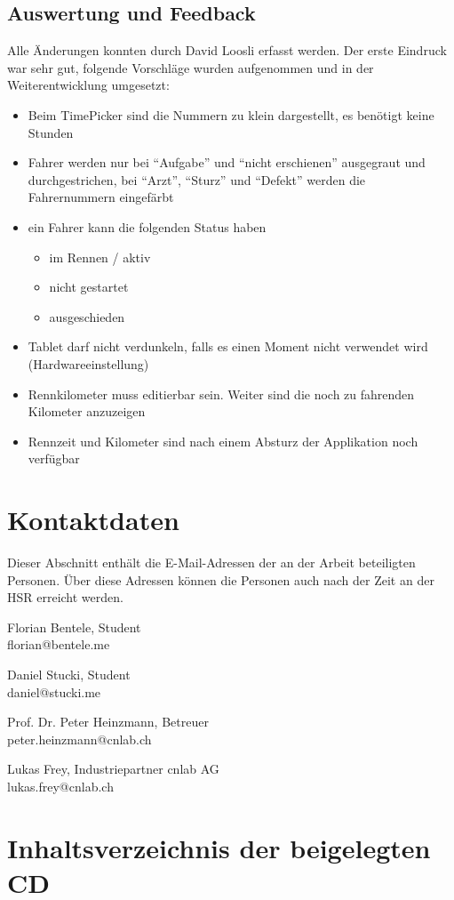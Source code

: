 \subsection{Auswertung und Feedback}
Alle Änderungen konnten durch David Loosli erfasst werden. Der erste Eindruck war sehr gut, folgende Vorschläge wurden aufgenommen und in der Weiterentwicklung umgesetzt:
\begin{itemize}
\item Beim TimePicker sind die Nummern zu klein dargestellt, es benötigt keine Stunden
\item Fahrer werden nur bei "`Aufgabe"'  und "`nicht erschienen"' ausgegraut und durchgestrichen, bei "`Arzt"', "`Sturz"' und "`Defekt"' werden die Fahrernummern eingefärbt
\item ein Fahrer kann die folgenden Status haben
\begin{itemize}
\item im Rennen / aktiv
\item nicht gestartet
\item ausgeschieden
\end{itemize}
\item Tablet darf nicht verdunkeln, falls es einen Moment nicht verwendet wird (Hardwareeinstellung)
\item Rennkilometer muss editierbar sein. Weiter sind die noch zu fahrenden Kilometer anzuzeigen
\item Rennzeit und Kilometer sind nach einem Absturz der Applikation noch verfügbar
\end{itemize}

\section{Kontaktdaten}
Dieser Abschnitt enthält die E-Mail-Adressen der an der Arbeit beteiligten Personen. Über diese Adressen können die Personen auch nach der Zeit an der HSR erreicht werden.


Florian Bentele, Student\\
florian@bentele.me

Daniel Stucki, Student\\
daniel@stucki.me

Prof. Dr. Peter Heinzmann, Betreuer\\
peter.heinzmann@cnlab.ch

Lukas Frey, Industriepartner cnlab AG\\
lukas.frey@cnlab.ch

\section{Inhaltsverzeichnis der beigelegten CD}

